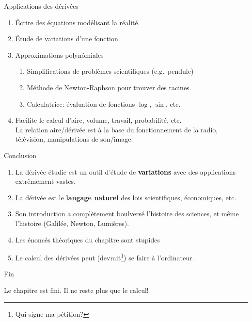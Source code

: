 \documentclass{beamer}
\begin{document}
\begin{frame}
    {Applications des dérivées}

    \begin{enumerate}
        \item Écrire des équations modélisant la réalité.
            \pause{}
        \item Étude de variations d'une fonction.
            \pause{}
        \item Approximations polynômiales
            \begin{enumerate}
                \item Simplifications de problèmes scientifiques (e.g.\ pendule)
                    \pause{}
                \item Méthode de Newton-Raphson pour trouver des racines.
                    \pause{}
                \item Calculatrice: évaluation de fonctions $\log$, $\sin$, etc.
            \end{enumerate}
            \pause{}
        \item Facilite le calcul d'aire, volume, travail, probabilité, etc.\\
            \pause{}
            La relation aire/dérivée est à la base du fonctionnement de la radio, télévision, manipulations de son/image.
    \end{enumerate}
\end{frame}

\begin{frame}
    {Conclusion}

    \begin{enumerate}
        \item La dérivée étudie est un outil d'étude de \textbf{variations} avec des applications extrêmement vastes.
            \pause{}
        \item La dérivée est le \textbf{langage naturel} des lois scientifiques, économiques, etc.
            \pause{}
        \item Son introduction a complètement boulversé l'histoire des sciences, et même l'histoire
            (Galilée, Newton, Lumières).
            \pause{}
        \item Les énoncés théoriques du chapitre sont stupides
            \pause{}
        \item Le calcul des dérivées peut (devrait\footnote{Qui signe ma pétition?}) se faire à l'ordinateur.
    \end{enumerate}
\end{frame}

\begin{frame}
    {Fin}

    Le chapitre est fini.
    Il ne reste plus que le calcul!
\end{frame}
\end{document}
